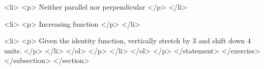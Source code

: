                                     <li>
                                        <p>
                                            Neither parallel nor perpendicular
                                        </p>
                                    </li>

                                    <li>
                                        <p>
                                            Increasing function
                                        </p>
                                    </li>

                                    <li>
                                        <p>
                                            Given the identity function, vertically stretch by 3 and shift down 4 units.
                                        </p>
                                    </li>
                                </ol>
                            </p>
                        </li>
                    </ol>
                </p>
            </statement>
        </exercise>
    </subsection>
</section>